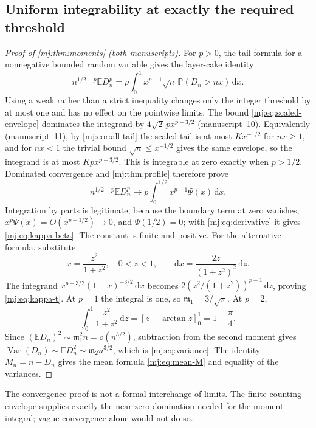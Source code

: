 \documentclass[11pt,a4paper]{article}
\theoremstyle{definition}\newaliascnt{definition}{theorem}
\theoremstyle{remark}\newaliascnt{remark}{theorem}
\newcommand{\dd}{\mathrm d}
\newcommand{\ljP}{\mathbb P}
\newcommand{\ljE}{\mathbb E}
\newcommand{\mjVar}{\operatorname{Var}}
\begin{document}
\subsection{Uniform integrability at exactly the required threshold}
\begin{proof}[Proof of \cref{mj:thm:moments} (both manuscripts)]
For $p>0$, the tail formula for a nonnegative bounded random variable gives
the layer-cake identity
\begin{equation}
 n^{1/2-p}\ljE D_n^p
 =p\int_0^1x^{p-1}\sqrt n\,\ljP(D_n>nx)\,\dd x.
 \label{mj:eq:layer-cake}
\end{equation}
Using a weak rather than a strict inequality changes only the integer
threshold by at most one and has no effect on the pointwise limits. The
bound \eqref{mj:eq:scaled-envelope} dominates the integrand by
$4\sqrt2\,p x^{p-3/2}$ (manuscript~10). Equivalently (manuscript~11), by
\cref{mj:cor:all-tail} the scaled tail is at most $Kx^{-1/2}$ for $nx\ge1$,
and for $nx<1$ the trivial bound $\sqrt n\le x^{-1/2}$ gives the same
envelope, so the integrand is at most $Kpx^{p-3/2}$. This is integrable at
zero exactly when $p>1/2$. Dominated convergence and
\cref{mj:thm:profile} therefore prove
\begin{equation}
 n^{1/2-p}\ljE D_n^p\longrightarrow
 p\int_0^{1/2}x^{p-1}\Psi(x)\,\dd x.
 \label{mj:eq:moment-tail-integral}
\end{equation}
Integration by parts is legitimate, because the boundary term at zero
vanishes, $x^p\Psi(x)=O(x^{p-1/2})\to0$, and $\Psi(1/2)=0$; with
\eqref{mj:eq:derivative} it gives \eqref{mj:eq:kappa-beta}. The constant is
finite and positive. For the alternative formula, substitute
\[
 x=\frac{z^2}{1+z^2},\quad 0<z<1,
 \qquad \dd x=\frac{2z}{(1+z^2)^2}\,\dd z.
\]
The integrand $x^{p-3/2}(1-x)^{-3/2}\,\dd x$ becomes
$2(z^2/(1+z^2))^{p-1}\,\dd z$, proving \eqref{mj:eq:kappa-t}. At $p=1$ the
integral is one, so $\mathfrak m_1=3/\sqrt\pi$. At $p=2$,
\[
 \int_0^1\frac{z^2}{1+z^2}\,\dd z
       =\left[z-\arctan z\right]_0^1=1-\frac\pi4.
\]
Since $(\ljE D_n)^2\sim\mathfrak m_1^2n=o(n^{3/2})$, subtraction from the
second moment gives $\mjVar(D_n)\sim\ljE D_n^2\sim\mathfrak m_2n^{3/2}$, which
is \eqref{mj:eq:variance}. The identity $M_n=n-D_n$ gives the mean formula
\eqref{mj:eq:mean-M} and equality of the variances.
\end{proof}

The convergence proof is not a formal interchange of limits. The finite
counting envelope supplies exactly the near-zero domination needed for the
moment integral; vague convergence alone would not do so.
\end{document}
